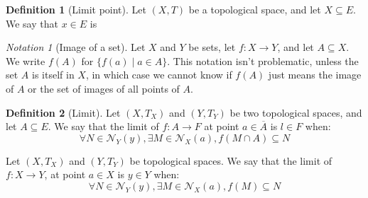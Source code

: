 \documentclass{article}
\theoremstyle{definition}
\newtheorem{definition}{Definition}[section]
\theoremstyle{remark}
\theoremstyle{example}
\theoremstyle{notation}
\newtheorem{notation}{Notation}[section]
\begin{document}
\begin{definition}[Limit point]
		Let $(X, T)$ be a topological space, and let $X \subseteq E$. We say that $x \in E$ is
\end{definition}




\begin{notation}[Image of a set]
		Let $X$ and $Y$ be sets, let $f : X \rightarrow Y$, and let $A \subseteq X$. We write $f(A)$ for $\{f(a) \mid a \in A\}$. This notation isn't problematic, unless the set $A$ is itself in $X$, in which case we cannot know if $f(A)$ just means the image of $A$ or the set of images of all points of $A$.
\end{notation}

\begin{definition}[Limit]
		Let $(X, T_X)$ and $(Y, T_Y)$ be two topological spaces, and let $A \subseteq E$. We say that the limit of $f : A \rightarrow F$ at point $a \in \overline{A}$ is $l \in F$ when:
				$$\forall N \in \mathcal{N}_Y(y), \exists M \in \mathcal{N}_X(a), f(M \cap A) \subseteq N$$

		Let $(X, T_X)$ and $(Y, T_Y)$ be topological spaces. We say that the limit of $f : X \rightarrow Y$, at point $a \in X$ is $y \in Y$ when:
				$$\forall N \in \mathcal{N}_Y(y), \exists M \in \mathcal{N}_X(a), f(M) \subseteq N$$

\end{definition}
\end{document}
